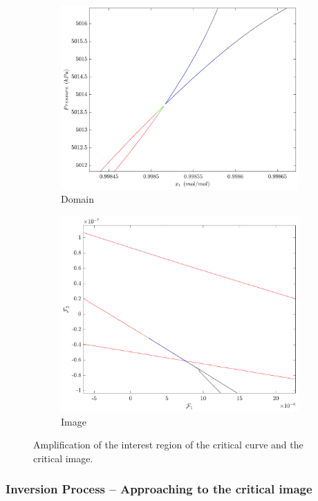 \documentclass[journal=iecred,manuscript=article]{achemso}
\theoremstyle{definition}
\theoremstyle{remark}
\begin{document}
\begin{figure}
\centering
\begin{subfigure}{.5\textwidth}
  \centering
  \includegraphics[width=.9\linewidth]{bicos_dominio}
  \caption{Domain}
  \label{fig:sub1}
\end{subfigure}%
\begin{subfigure}{.5\textwidth}
  \centering
  \includegraphics[width=.9\linewidth]{bicos_imagem}
  \caption{Image}
  \label{fig:sub2}
\end{subfigure}
\caption{Amplification of the interest region of the critical curve and the critical image.}
\label{fig:domain_image}
\end{figure}

\subsubsection{Inversion Process -- Approaching to the critical image}
\end{document}
